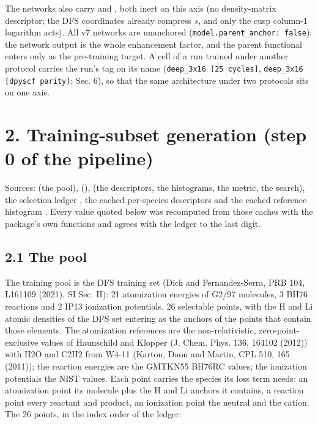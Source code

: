 \documentclass[10pt,a4paper]{article}
\begin{document}
The  networks also carry  and , both inert on this axis (no density-matrix descriptor; the DFS coordinates already compress $s$, and only the cusp column-1 logarithm acts). All v7 networks are unanchored (\texttt{model.parent\_anchor: false}): the network output is the whole enhancement factor, and the parent functional enters only as the pre-training target. A cell of a run trained under another protocol carries the run's tag on its name (\texttt{deep\_3x16 [25 cycles]}, \texttt{deep\_3x16 [dpyscf parity]}; Sec. 6), so that the same architecture under two protocols sits on one axis.

\section*{2. Training-subset generation (step 0 of the pipeline)}

Sources:  (the pool),  (),  (the descriptors, the histograms, the metric, the search), the selection ledger , the cached per-species descriptors  and the cached reference histogram . Every value quoted below was recomputed from those caches with the package's own functions and agrees with the ledger to the last digit.

\subsection*{2.1 The pool}

The training pool is the DFS training set (Dick and Fernandez-Serra, PRB 104, L161109 (2021), SI Sec. II): 21 atomization energies of G2/97 molecules, 3 BH76 reactions and 2 IP13 ionization potentials, 26 selectable points, with the H and Li atomic densities of the DFS set entering as the anchors of the points that contain those elements. The atomization references are the non-relativistic, zero-point-exclusive values of Haunschild and Klopper (J. Chem. Phys. 136, 164102 (2012)) with H2O and C2H2 from W4-11 (Karton, Daon and Martin, CPL 510, 165 (2011)); the reaction energies are the GMTKN55 BH76RC values; the ionization potentials the NIST values. Each point carries the species its loss term needs: an atomization point its molecule plus the H and Li anchors it contains, a reaction point every reactant and product, an ionization point the neutral and the cation. The 26 points, in the index order of the ledger:
\end{document}
